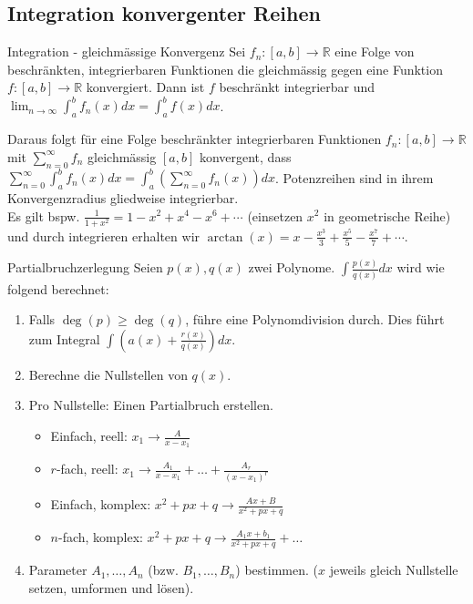 \documentclass[a4paper,10pt]{article}
\def\limn{\lim_{n\to \infty}}
\def\sumn{\sum_{n=0}^\infty}
\begin{document}
\subsection{Integration konvergenter Reihen}
\begin{subbox}{Integration - gleichmässige Konvergenz}
  Sei $f_n: [a, b] \to \mathbb{R}$ eine Folge von beschränkten, integrierbaren Funktionen die gleichmässig gegen eine Funktion $f: [a, b] \to \mathbb{R}$ konvergiert. Dann ist $f$ beschränkt integrierbar und $\limn \int_a^b f_n(x)dx = \int_a^b f(x)dx$.
\end{subbox}
Daraus folgt für eine Folge beschränkter integrierbaren Funktionen $f_n: [a, b] \to \mathbb{R}$ mit $\sumn f_n$ gleichmässig $[a, b]$ konvergent, dass $\sumn \int_a^b f_n(x)dx = \int_a^b (\sumn f_n(x))dx$. Potenzreihen sind in ihrem Konvergenzradius gliedweise integrierbar.\\
Es gilt bspw. $\frac{1}{1 + x^2} = 1 - x^2 + x^4 - x^6 + \cdots$ (einsetzen $x^2$ in geometrische Reihe) und durch integrieren erhalten wir $\arctan(x) = x - \frac{x^3}{3} + \frac{x^5}{5} - \frac{x^7}{7} + \cdots$.

\begin{mainbox}{Partialbruchzerlegung}
 Seien $p(x), q(x)$ zwei Polynome. $\int \frac{p(x)}{q(x)} dx$ wird wie folgend berechnet:
 \begin{enumerate}
  \item Falls $\deg(p) \ge \deg(q)$, führe eine Polynomdivision durch. Dies führt zum Integral $\int (a(x) + \frac{r(x)}{q(x)})dx$.
  \item Berechne die Nullstellen von $q(x)$.
  \item Pro Nullstelle: Einen Partialbruch erstellen.
  \begin{itemize}[left=0pt]
   \item Einfach, reell: $x_1 \to \frac{A}{x - x_1}$
   \item $r$-fach, reell: $x_1 \to \frac{A_1}{x - x_1} + \ldots + \frac{A_r}{(x-x_1)^r}$ 
   \item Einfach, komplex: $x^2 + px + q \to \frac{Ax + B} {x^2 + px + q}$
   \item $n$-fach, komplex: $x^2 + px + q \to \frac{A_1x+b_1}{x^2+px+q} + \ldots$
  \end{itemize}
  \item Parameter $A_1, \ldots, A_n$ (bzw. $B_1, \ldots, B_n$) bestimmen. ($x$ jeweils gleich Nullstelle setzen, umformen und lösen).

 \end{enumerate}
\end{mainbox}
\end{document}
